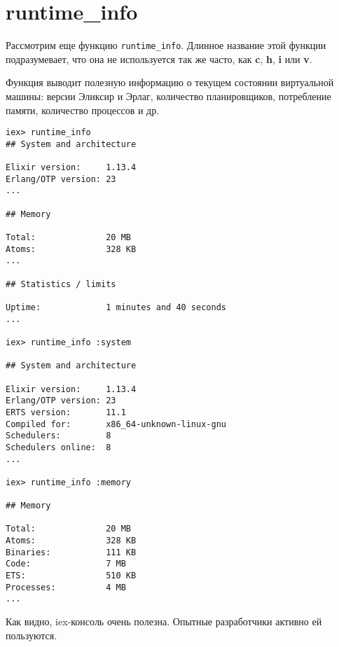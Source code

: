 \section{runtime\_info}

Рассмотрим еще функцию \texttt{runtime\_info}. Длинное название этой функции подразумевает, что она не используется так же часто, как \textbf{c}, \textbf{h}, \textbf{i} или \textbf{v}.

Функция выводит полезную информацию о текущем состоянии виртуальной машины: версии Эликсир и Эрлаг, количество планировщиков, потребление памяти, количество процессов и др.

\begin{lstlisting}[language=ElixirShell, style=elixir-shell]
iex> runtime_info
## System and architecture

Elixir version:     1.13.4
Erlang/OTP version: 23
...

## Memory

Total:              20 MB
Atoms:              328 KB
...

## Statistics / limits

Uptime:             1 minutes and 40 seconds
...

iex> runtime_info :system

## System and architecture

Elixir version:     1.13.4
Erlang/OTP version: 23
ERTS version:       11.1
Compiled for:       x86_64-unknown-linux-gnu
Schedulers:         8
Schedulers online:  8
...

iex> runtime_info :memory

## Memory

Total:              20 MB
Atoms:              328 KB
Binaries:           111 KB
Code:               7 MB
ETS:                510 KB
Processes:          4 MB
...
\end{lstlisting}

Как видно, iex-консоль очень полезна. Опытные разработчики активно ей пользуются.
